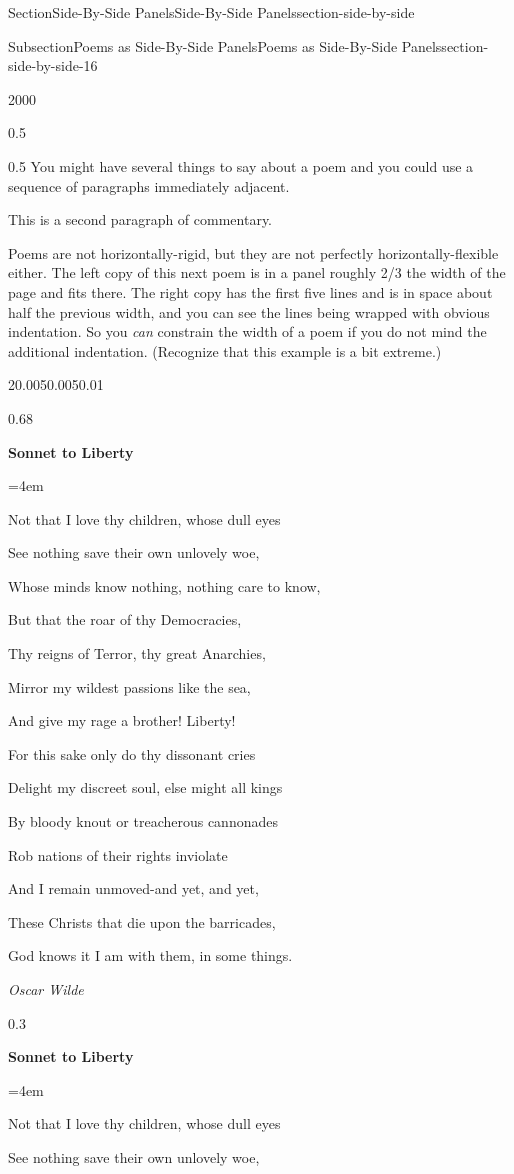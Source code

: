 \documentclass[twoside,10pt,]{article}
\numberwithin{equation}{section}
\newenvironment{poem}{\setlength{\parindent}{0em}}{}
\newcommand{\poemTitle}[1]{\begin{center}\large\textbf{#1}\end{center}}
\newenvironment{stanza}{\vspace{0.25 em}\hangindent=4em}{\vspace{1 em}}
\newcommand{\poemauthorleft}[1]{\vspace{-1em}\begin{flushleft}\textit{#1}\end{flushleft}}
\newcommand{\poemlineleft}[1]{{\raggedright{#1}\par}\vspace{-\parskip}}
\begin{document}
\begin{sectionptx}{Section}{Side-By-Side Panels}{}{Side-By-Side Panels}{}{}{section-side-by-side}
\begin{subsectionptx}{Subsection}{Poems as Side-By-Side Panels}{}{Poems as Side-By-Side Panels}{}{}{section-side-by-side-16}
\begin{sidebyside}{2}{0}{0}{0}
\begin{sbspanel}{0.5}
\end{sbspanel}%
\begin{sbspanel}{0.5}%
You might have several things to say about a poem and you could use a sequence of paragraphs immediately adjacent.%
\par
This is a second paragraph of commentary.%
\end{sbspanel}%
\end{sidebyside}%
\par
Poems are not horizontally-rigid, but they are not perfectly horizontally-flexible either.  The left copy of this next poem is in a panel roughly 2\slash{}3 the width of the page and fits there.  The right copy has the first five lines and is in space about half the previous width, and you can see the lines being wrapped with obvious indentation.  So you \emph{can} constrain the width of a poem if you do not mind the additional indentation.  (Recognize that this example is a bit extreme.)%
\begin{sidebyside}{2}{0.005}{0.005}{0.01}%
\begin{sbspanel}{0.68}%
\begin{poem}%
\poemTitle{Sonnet to Liberty}
%
\begin{stanza}
\poemlineleft{Not that I love thy children, whose dull eyes}
\poemlineleft{See nothing save their own unlovely woe,}
\poemlineleft{Whose minds know nothing, nothing care to know,}
\poemlineleft{But that the roar of thy Democracies,}
\poemlineleft{Thy reigns of Terror, thy great Anarchies,}
\poemlineleft{Mirror my wildest passions like the sea,}
\poemlineleft{And give my rage a brother! Liberty!}
\poemlineleft{For this sake only do thy dissonant cries}
\poemlineleft{Delight my discreet soul, else might all kings}
\poemlineleft{By bloody knout or treacherous cannonades}
\poemlineleft{Rob nations of their rights inviolate}
\poemlineleft{And I remain unmoved-and yet, and yet,}
\poemlineleft{These Christs that die upon the barricades,}
\poemlineleft{God knows it I am with them, in some things.}
\end{stanza}
\poemauthorleft{Oscar Wilde}
\end{poem}
\end{sbspanel}%
\begin{sbspanel}{0.3}%
\begin{poem}%
\poemTitle{Sonnet to Liberty}
\begin{stanza}
\poemlineleft{Not that I love thy children, whose dull eyes}
\poemlineleft{See nothing save their own unlovely woe,}

\end{stanza}
\end{poem}
\end{sbspanel}
\end{sidebyside}
\end{subsectionptx}
\end{sectionptx}
\end{document}
